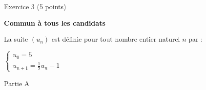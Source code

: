 
%
\begin{h2}Exercice 3   (5 points)\end{h2}
\textbf{Commun à tous les candidats}
\par
La suite $\left(u_{n}\right)$ est définie pour tout nombre entier naturel $n$ par :

\begin{center}
$\left\{ \begin{matrix} u_{0} = 5 \\ u_{n+1}  = \frac{1}{2}u_{n}+1\end{matrix}\right.$
\end{center}
\medskip
     \begin{h3}Partie A\end{h3}
